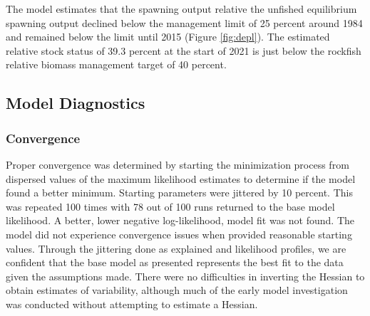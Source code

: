 \documentclass[11pt,
  english,
  a4paper,
]{article}
\begin{document}
\leavevmode\tagmcend\tagstructend\par


The model estimates that the spawning output relative the unfished equilibrium spawning output declined below the management limit of 25 percent around 1984 and remained below the limit until 2015 (Figure \ref{fig:depl}). The estimated relative stock status of 39.3 percent at the start of 2021 is just below the rockfish relative biomass management target of 40 percent.

\leavevmode\tagmcend\tagstructend\par


\hypertarget{model-diagnostics}{%
\subsection{Model Diagnostics}\label{model-diagnostics}}

\leavevmode\tagmcend\tagstructend


\hypertarget{convergence}{%
\subsubsection{Convergence}\label{convergence}}

\leavevmode\tagmcend\tagstructend


Proper convergence was determined by starting the minimization process from dispersed values of the maximum likelihood estimates to determine if the model found a better minimum. Starting parameters were jittered by 10 percent. This was repeated 100 times with 78 out of 100 runs returned to the base model likelihood. A better, lower negative log-likelihood, model fit was not found. The model did not experience convergence issues when provided reasonable starting values. Through the jittering done as explained and likelihood profiles, we are confident that the base model as presented represents the best fit to the data given the assumptions made. There were no difficulties in inverting the Hessian to obtain estimates of variability, although much of the early model investigation was conducted without attempting to estimate a Hessian.

\leavevmode\tagmcend\tagstructend\par
\end{document}
